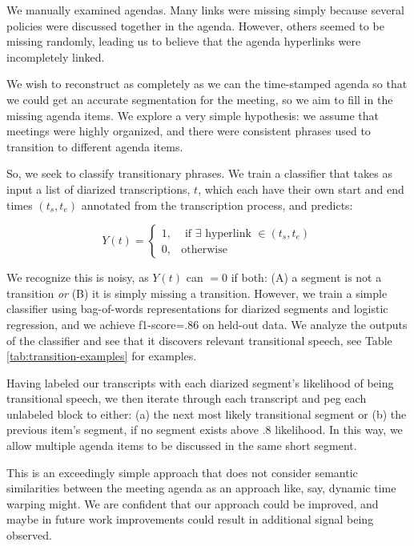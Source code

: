\documentclass[11pt]{article}
\begin{document}
We manually examined agendas. Many links were missing simply because several policies were discussed together in the agenda. However, others seemed to be missing randomly, leading us to believe that the agenda hyperlinks were incompletely linked. 

We wish to reconstruct as completely as we can the time-stamped agenda so that we could get an accurate segmentation for the meeting, so we aim to fill in the missing agenda items. We explore a very simple hypothesis: we assume that meetings were highly organized, and there were consistent phrases used to transition to different agenda items. 

So, we seek to classify transitionary phrases. We train a classifier that takes as input a list of diarized transcriptions, $t$, which each have their own start and end times $(t_s, t_e)$ annotated from the transcription process, and predicts:

\begin{equation}
Y(t) =
\begin{cases}
  1, & \text{ if } \exists \text{ hyperlink } \in (t_s, t_e) \\
  0, & \text{otherwise}
\end{cases}
\label{eq:newsworthiness-label}
\end{equation}

We recognize this is noisy, as $Y(t)$ can $=0$ if both: (A) a segment is not a transition \textit{or} (B) it is simply missing a transition. However, we train a simple classifier using bag-of-words representations for diarized segments and logistic regression, and we achieve f1-score=.86 on held-out data. We analyze the outputs of the classifier and see that it discovers relevant transitional speech, see Table \ref{tab:transition-examples} for examples. 

Having labeled our transcripts with each diarized segment's likelihood of being transitional speech, we then iterate through each transcript and peg each unlabeled block to either: (a) the next most likely transitional segment or (b) the previous item's segment, if no segment exists above $.8$ likelihood. In this way, we allow multiple agenda items to be discussed in the same short segment.

This is an exceedingly simple approach that does not consider semantic similarities between the meeting agenda as an approach like, say, dynamic time warping \cite{} might. We are confident that our approach could be improved, and maybe in future work improvements could result in additional signal being observed.
\end{document}
